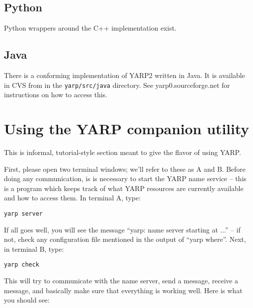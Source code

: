 \documentclass[a4]{article}
\begin{document}
\subsection{Python}

Python wrappers around the C++ implementation exist.


\subsection{Java}

There is a conforming implementation of YARP2 written in Java.
It is available in CVS from in the {\tt yarp/src/java}
directory.
See yarp0.sourceforge.net for instructions on how to access this.


\appendix

\section{Using the YARP companion utility}

\label{sect:using-utility}

This is informal, tutorial-style section meant to give the flavor
of using YARP.

First, please
open two terminal windows; we'll refer to these as A and B.
%
Before doing any communication, is is necessary to start the YARP name
service -- this is a program which keeps track of what YARP resources
are currently available and how to access them.
%
In terminal A, type:

\begin{verbatim}
yarp server
\end{verbatim}

If all goes well, you will see the message ``yarp: name server starting at ...'' -- if not, check any configuration file
mentioned in the output of ``yarp where''.
%
Next, in terminal B, type:
%
\begin{verbatim}
yarp check
\end{verbatim}
%
This will try to communicate with the name server, send a message,
receive a message, and basically make sure that everything is
working well.  Here is what you should see:
\end{document}
